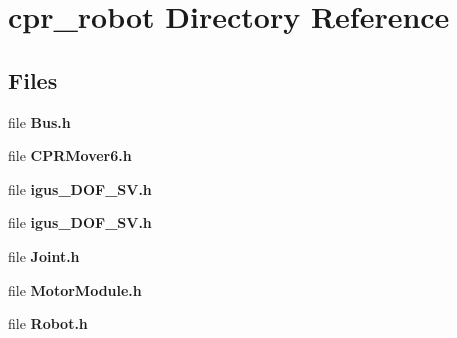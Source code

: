 \section{cpr\+\_\+robot Directory Reference}
\label{dir_07ad1e5a625ab4cd64ad9a6637a62567}
\subsection*{Files}
\begin{DoxyCompactItemize}
\item 
file \textbf{ Bus.\+h}
\item 
file \textbf{ C\+P\+R\+Mover6.\+h}
\item 
file \textbf{ igus\+\_\+D\+O\+F\+\_\+\+S\+V.\+h}
\item 
file \textbf{ igus\+\_\+D\+O\+F\+\_\+\+S\+V.\+h}
\item 
file \textbf{ Joint.\+h}
\item 
file \textbf{ Motor\+Module.\+h}
\item 
file \textbf{ Robot.\+h}
\end{DoxyCompactItemize}
